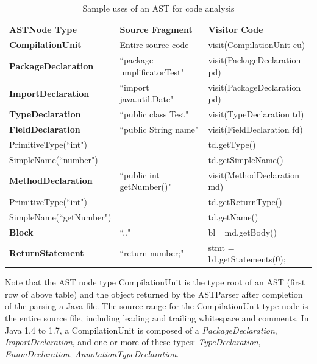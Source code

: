 \newcommand*{\MyIndent}{\hspace*{0.4cm}}%
\begin{table}[h]
\caption{Sample uses of an AST for code analysis}
\label{table:astanalysis}
\begin{tabular}{l|p{4cm}p{4cm}}
\toprule
\rowcolor[HTML]{BBDAFF}
\textbf{ASTNode Type} & \textbf{Source Fragment}  & \textbf{Visitor Code}  \\ \midrule	
\textbf{CompilationUnit} &  Entire source code & visit(CompilationUnit cu) \\ \hline
\MyIndent \textbf{PackageDeclaration}& ``package umplificatorTest" & visit(PackageDeclaration pd) \\ \hline
\MyIndent \textbf{ImportDeclaration} & ``import java.util.Date" & visit(PackageDeclaration pd) \\ \hline
\MyIndent \textbf{TypeDeclaration} &  ``public class Test" & visit(TypeDeclaration td) \\ \hline
\MyIndent \MyIndent \textbf{FieldDeclaration} &  ``public String name" & visit(FieldDeclaration fd) \\ 
\MyIndent \MyIndent \MyIndent PrimitiveType(``int") &   &  td.getType() \\ 
\MyIndent \MyIndent \MyIndent SimpleName(``number") &   &  td.getSimpleName() \\ \hline
\MyIndent \MyIndent \textbf{MethodDeclaration} &  ``public int getNumber()" & visit(MethodDeclaration md) \\ 
\MyIndent \MyIndent \MyIndent PrimitiveType(``int") &   &  td.getReturnType() \\ 
\MyIndent \MyIndent \MyIndent SimpleName(``getNumber") &   &  td.getName() \\ \hline
\MyIndent \MyIndent \MyIndent \MyIndent \textbf{Block} & ``{..}"& bl=  md.getBody() \\ 
\MyIndent \MyIndent \MyIndent  \MyIndent \MyIndent \textbf{ReturnStatement} &  ``return number;" & stmt = b1.getStatements(0); \\ \bottomrule
\end{tabular}
\end{table}

Note that the AST node type CompilationUnit is the type root of an AST (first row of above table) and the object returned by the ASTParser after completion of the parsing a Java file. The source range for the CompilationUnit type node is the entire source file, including leading and trailing whitespace and comments. In Java 1.4 to 1.7, a CompilationUnit is composed of 
a \textit{PackageDeclaration}, \textit{ImportDeclaration}, and one or more of these types:  \textit{TypeDeclaration}, \textit{EnumDeclaration}, \textit{AnnotationTypeDeclaration}. 

